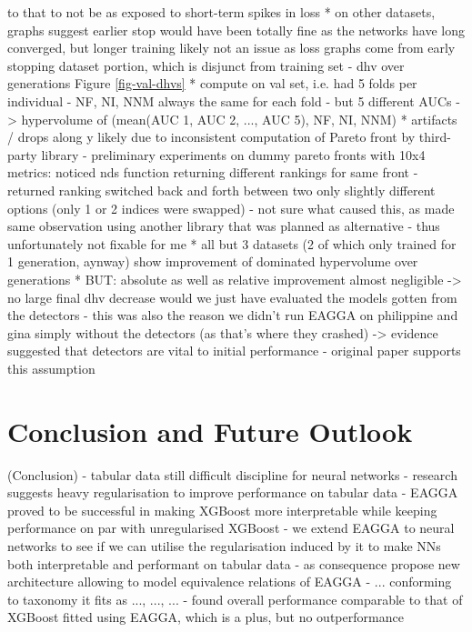 \documentclass[twoside,11pt]{article}
\begin{document}
    to that to not be as exposed to short-term spikes in loss
  * on other datasets, graphs suggest earlier stop would have been totally fine as the networks have long converged, but longer training likely not an issue as loss
    graphs come from early stopping dataset portion, which is disjunct from training set
- dhv over generations Figure \ref{fig-val-dhvs}
  * compute on val set, i.e. had 5 folds per individual
    - NF, NI, NNM always the same for each fold
    - but 5 different AUCs
    -> hypervolume of (mean(AUC 1, AUC 2, ..., AUC 5), NF, NI, NNM)
  * artifacts / drops along y likely due to inconsistent computation of Pareto front by third-party library
    - preliminary experiments on dummy pareto fronts with 10x4 metrics: noticed nds function returning different rankings for same front
    - returned ranking switched back and forth between two only slightly different options (only 1 or 2 indices were swapped)
    - not sure what caused this, as made same observation using another library that was planned as alternative
    - thus unfortunately not fixable for me
  * all but 3 datasets (2 of which only trained for 1 generation, aynway) show improvement of dominated hypervolume over generations
  * BUT: absolute as well as relative improvement almost negligible -> no large final dhv decrease would we just have evaluated the models gotten from the detectors
    - this was also the reason we didn't run EAGGA on philippine and gina simply without the detectors (as that's where they crashed) -> evidence suggested that detectors are vital to initial performance
    - original paper supports this assumption \citep[Fig. 4, p. 545]{EAGGA}


\section{Conclusion and Future Outlook}
(Conclusion)
- tabular data still difficult discipline for neural networks
- research suggests heavy regularisation to improve performance on tabular data
- EAGGA proved to be successful in making XGBoost more interpretable while keeping performance on par with unregularised XGBoost
- we extend EAGGA to neural networks to see if we can utilise the regularisation induced by it to make NNs both interpretable and performant on tabular data
- as consequence propose new architecture allowing to model equivalence relations of EAGGA
- ... conforming to \citet[chap. 2]{survey_NN_interpretability} taxonomy it fits as ..., ..., ... %
- found overall performance comparable to that of XGBoost fitted using EAGGA, which is a plus, but no outperformance
\end{document}

